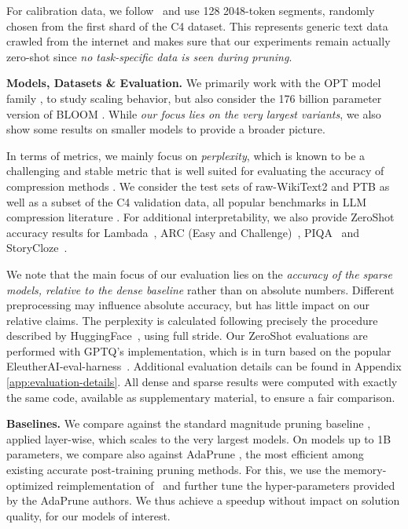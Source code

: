 \documentclass{article}
\theoremstyle{plain}
\theoremstyle{definition}
\theoremstyle{remark}
\renewcommand{\paragraph}[1]{\vspace{-0.1em} \noindent \textbf{#1}}
\begin{document}
For calibration data, we follow~\citet{frantar2022gptq} and use 128 2048-token segments, randomly chosen from the first shard of the C4 \cite{C4} dataset. 
This represents generic text data crawled from the internet and makes sure that our experiments remain actually zero-shot since \emph{no task-specific data is seen during pruning}.

\paragraph{Models, Datasets \& Evaluation.} We primarily work with the OPT model family \cite{zhang2022opt}, to study scaling behavior, but also consider the 176 billion parameter version of BLOOM \cite{scao2022bloom}. While \emph{our focus lies on the very largest variants}, we also show some results on smaller models to provide a broader picture.

In terms of metrics, we mainly focus on \textit{perplexity}, which is known to be a challenging and stable metric that is well suited for evaluating the accuracy of compression methods \cite{yao2022zeroquant, frantar2022obc, dettmers2022case}. We consider the test sets of raw-WikiText2 \cite{wikitext103} and PTB \cite{PTB} as well as a subset of the C4 validation data, all popular benchmarks in LLM compression literature \cite{yao2022zeroquant, park2022nuqmm, frantar2022gptq, xiao2022smoothquant}. For additional interpretability, we also provide ZeroShot accuracy results for Lambada~\cite{paperno2016lambada}, ARC (Easy and Challenge)~\cite{boratko2018systematic},  PIQA~\cite{tata2003piqa} and StoryCloze~\cite{mostafazadeh2017lsdsem}.

We note that the main focus of our evaluation lies on the \emph{accuracy of the sparse models, relative to the dense baseline} rather than on absolute numbers. Different preprocessing may influence absolute accuracy, but has little impact on our relative claims.  The perplexity is calculated following precisely the procedure described by HuggingFace~\cite{hfperplexity}, using full stride. Our ZeroShot evaluations are performed with GPTQ's \cite{frantar2022gptq} implementation, which is in turn based on the popular EleutherAI-eval-harness~\cite{eleuther}. Additional evaluation details can be found in Appendix \ref{app:evaluation-details}. All dense and sparse results were computed with exactly the same code, available as supplementary material, to ensure a fair comparison.

\paragraph{Baselines.} We compare against the standard magnitude pruning baseline \cite{zhu2017prune}, applied layer-wise, which scales to the very largest models. 
On models up to 1B parameters, we compare also against AdaPrune \cite{hubara2021accelerated}, the most efficient among existing accurate post-training pruning methods. 
For this, we use the memory-optimized reimplementation of~\citet{frantar2022spdy} and further tune the hyper-parameters provided by the AdaPrune authors. We thus achieve a  speedup without impact on solution quality, for our models of interest.
\vspace{-15pt}
\end{document}
